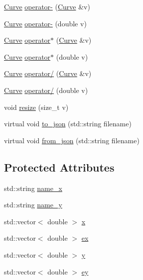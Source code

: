 \begin{DoxyCompactItemize}
\hyperlink{class_curve}{Curve} \hyperlink{class_curve_a55facce84fd4b5bd58124772735c9248}{operator-\/} (\hyperlink{class_curve}{Curve} \&v)
\item 
\hyperlink{class_curve}{Curve} \hyperlink{class_curve_a1f487e5943b841112dd72c077dee56f6}{operator-\/} (double v)
\item 
\hyperlink{class_curve}{Curve} \hyperlink{class_curve_a671fb149eecca0baf80672a6e2ffc8a5}{operator$\ast$} (\hyperlink{class_curve}{Curve} \&v)
\item 
\hyperlink{class_curve}{Curve} \hyperlink{class_curve_a9ed9c49020ce01f29587000711963beb}{operator$\ast$} (double v)
\item 
\hyperlink{class_curve}{Curve} \hyperlink{class_curve_abec3bbbc40b1c643ccb31299dfd53a4d}{operator/} (\hyperlink{class_curve}{Curve} \&v)
\item 
\hyperlink{class_curve}{Curve} \hyperlink{class_curve_aff93a6c6139f9cc008d202ca5ea995e0}{operator/} (double v)
\item 
void \hyperlink{class_curve_a69f0cd9336dba793efe1398a6997c5a0}{resize} (size\+\_\+t v)
\item 
virtual void \hyperlink{class_curve_a6c16b3a6a4f4bd9540780d4e68d90545}{to\+\_\+json} (std\+::string filename)
\item 
virtual void \hyperlink{class_curve_aa4b45f195d903ae171dd7572cc5fb796}{from\+\_\+json} (std\+::string filename)
\end{DoxyCompactItemize}
\subsection*{Protected Attributes}
\begin{DoxyCompactItemize}
\item 
std\+::string \hyperlink{class_curve_a5ac159e573a921630bed5093ac3ceae5}{name\+\_\+x}
\item 
std\+::string \hyperlink{class_curve_aecd575bb016b03dd2c1777153f72931a}{name\+\_\+y}
\item 
std\+::vector$<$ double $>$ \hyperlink{class_curve_ae97afae63534c34353e3fc6f5e9d7a8d}{x}
\item 
std\+::vector$<$ double $>$ \hyperlink{class_curve_aaabf36e61b8b305b761587e4cc9737e3}{ex}
\item 
std\+::vector$<$ double $>$ \hyperlink{class_curve_a81ad07dc5dccb7a05870b6341ae78364}{y}
\item 
std\+::vector$<$ double $>$ \hyperlink{class_curve_a76092a26c2894325fda94d4f64326b52}{ey}
\end{DoxyCompactItemize}


